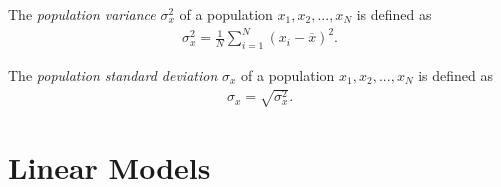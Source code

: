 \documentclass{article}
\renewcommand{\bar}{\overline}
\begin{document}
\begin{definition}
	The \emph{population variance} $\sigma_x^2$ of a population $x_1, x_2, ..., x_N$ is defined as
	\begin{align*}
		\sigma_x^2 =\frac{1}{N}\sum_{i=1}^N (x_i-\bar x)^2.
	\end{align*}
\end{definition}
\begin{definition}
	The \emph{population standard deviation} $\sigma_x$ of a population $x_1, x_2, ..., x_N$ is defined as
	\begin{align*}
		\sigma_x = \sqrt{\sigma_x^2}.
	\end{align*}
\end{definition}


\section{Linear Models}
\end{document}
